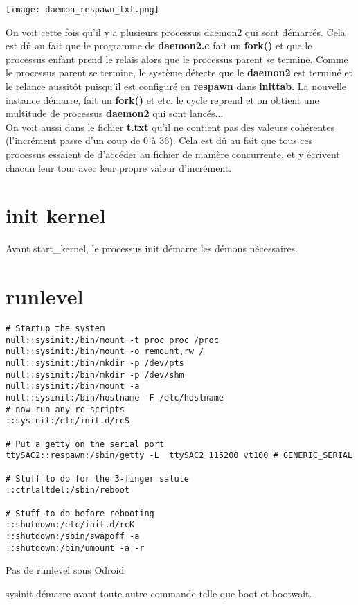 \begin{center} 
\hspace{15cm}
\texttt{[image: daemon\_respawn\_txt.png]}
\end{center}
\vspace{0.5cm}

On voit cette fois qu'il y a plusieurs processus daemon2 qui sont démarrés. Cela est dû au fait que le programme de \textbf{daemon2.c} fait un \textbf{fork()} et que le processus enfant prend le relais alors que le processus parent se termine. Comme le processus parent se termine, le système détecte que le \textbf{daemon2} est terminé et le relance aussitôt puisqu'il est configuré en \textbf{respawn} dans \textbf{inittab}. La nouvelle instance démarre, fait un \textbf{fork()} et etc. le cycle reprend et on obtient une multitude de processus \textbf{daemon2} qui sont lancés...\\

On voit aussi dans le fichier \textbf{t.txt} qu'il ne contient pas des valeurs cohérentes (l'incrément passe d'un coup de 0 à 36). Cela est dû au fait que tous ces processus essaient de d'accéder au fichier de manière concurrente, et y écrivent chacun leur tour avec leur propre valeur d'incrément.

\section{init kernel}
Avant start\_kernel, le processus init démarre les démons nécessaires. 

\section{runlevel}
\begin{lstlisting}[style=Bash]
# Startup the system
null::sysinit:/bin/mount -t proc proc /proc
null::sysinit:/bin/mount -o remount,rw /
null::sysinit:/bin/mkdir -p /dev/pts
null::sysinit:/bin/mkdir -p /dev/shm
null::sysinit:/bin/mount -a
null::sysinit:/bin/hostname -F /etc/hostname
# now run any rc scripts
::sysinit:/etc/init.d/rcS

# Put a getty on the serial port
ttySAC2::respawn:/sbin/getty -L  ttySAC2 115200 vt100 # GENERIC_SERIAL

# Stuff to do for the 3-finger salute
::ctrlaltdel:/sbin/reboot

# Stuff to do before rebooting
::shutdown:/etc/init.d/rcK
::shutdown:/sbin/swapoff -a
::shutdown:/bin/umount -a -r
\end{lstlisting}
Pas de runlevel sous Odroid

sysinit démarre avant toute autre commande telle que boot et bootwait.
